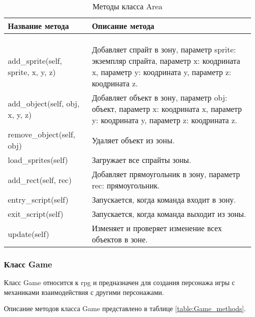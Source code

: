 \begin{xltabular}{\textwidth}{|X|X|}
	\caption{Методы класса Area}\label{table:Area_methods} \\
	\hline \centrow
	Название метода & \centrow  Описание метода \\
	\hline {} &  \\ \hline
	\endfirsthead
	\\
	\hline {} &  \\ \hline
	\finishhead
	add\_sprite(self, sprite, x, y, z) & Добавляет спрайт в зону, параметр sprite: экземпляр спрайта, параметр x: коодрината x, параметр y: коодрината y, параметр z: коодрината z. \\
	\hline
	add\_object(self, obj, x, y, z) & Добавляет объект в зону, параметр obj: объект, параметр x: коодрината x, параметр y: коодрината y, параметр z: коодрината z. \\
	\hline
	remove\_object(self, obj) & Удаляет объект из зоны. \\
	\hline
	load\_sprites(self) & Загружает все спрайты зоны. \\
	\hline
	add\_rect(self, rec) &  Добавляет прямоугольник в зону, параметр rec: прямоугольник. \\
	\hline
	entry\_script(self) & Запускается, когда команда входит в зону. \\
	\hline
	exit\_script(self) & Запускается, когда команда выходит из зоны. \\
	\hline
	update(self) & Изменяет и проверяет изменение всех объектов в зоне. \\
	\hline
\end{xltabular}

\subsubsection{Класс Game}

Класс Game относится к rpg и предназначен для создания персонажа игры с механиками взаимодействия с другими персонажами.

Описание методов класса Game представлено в таблице \ref{table:Game_methods}.

